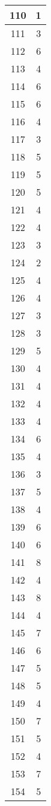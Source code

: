 \documentclass[letterpaper, 12pt]{article}
\begin{document}
\begin{longtable}{|c|c|}
\hline
110 & 1 \\
\hline
111 & 3 \\
\hline
112 & 6 \\
\hline
113 & 4 \\
\hline
114 & 6 \\
\hline
115 & 6 \\
\hline
116 & 4 \\
\hline
117 & 3 \\
\hline
118 & 5 \\
\hline
119 & 5 \\
\hline
120 & 5 \\
\hline
121 & 4 \\
\hline
122 & 4 \\
\hline
123 & 3 \\
\hline
124 & 2 \\
\hline
125 & 4 \\
\hline
126 & 4 \\
\hline
127 & 3 \\
\hline
128 & 3 \\
\hline
129 & 5 \\
\hline
130 & 4 \\
\hline
131 & 4 \\
\hline
132 & 4 \\
\hline
133 & 4 \\
\hline
134 & 6 \\
\hline
135 & 4 \\
\hline
136 & 3 \\
\hline
137 & 5 \\
\hline
138 & 4 \\
\hline
139 & 6 \\
\hline
140 & 6 \\
\hline
141 & 8 \\
\hline
142 & 4 \\
\hline
143 & 8 \\
\hline
144 & 4 \\
\hline
145 & 7 \\
\hline
146 & 6 \\
\hline
147 & 5 \\
\hline
148 & 5 \\
\hline
149 & 4 \\
\hline
150 & 7 \\
\hline
151 & 5 \\
\hline
152 & 4 \\
\hline
153 & 7 \\
\hline
154 & 5 \\

\end{longtable}
\end{document}
